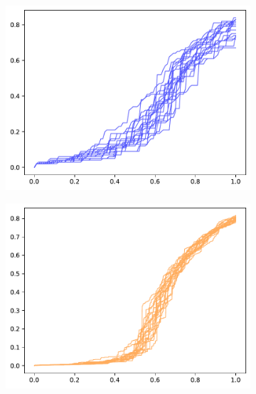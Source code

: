 \documentclass[twoside,10pt]{article}
\begin{document}
\begin{figure}[H]
        \centering
        \begin{subfigure}
                \centering
                \includegraphics[scale=0.3]{fig/100.pdf}
        \end{subfigure}
        \begin{subfigure}
                \centering
                \includegraphics[scale=0.3]{fig/1000.pdf}
        \end{subfigure}
        \begin{subfigure}
                \centering

\end{subfigure}
\end{figure}
\end{document}
